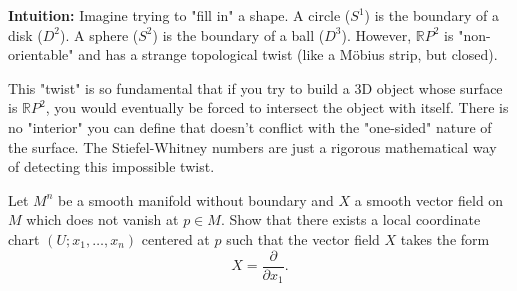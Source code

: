 \begin{solution}
\textbf{Intuition:}
Imagine trying to "fill in" a shape. A circle ($S^1$) is the boundary of a disk ($D^2$). A sphere ($S^2$) is the boundary of a ball ($D^3$). However, $\mathbb{R}P^2$ is "non-orientable" and has a strange topological twist (like a Möbius strip, but closed). 
\par\vspace{\baselineskip}

This "twist" is so fundamental that if you try to build a 3D object whose surface is $\mathbb{R}P^2$, you would eventually be forced to intersect the object with itself. There is no "interior" you can define that doesn't conflict with the "one-sided" nature of the surface. The Stiefel-Whitney numbers are just a rigorous mathematical way of detecting this impossible twist.
\end{solution}

\begin{exercise}
\label{geometry:2015:3}
Let $M^{n}$ be a smooth manifold without boundary and $X$ a smooth vector field on $M$ which does not vanish at $p \in M$. Show that there exists a local coordinate chart $(U; x_{1}, \ldots, x_{n})$ centered at $p$ such that the vector field $X$ takes the form
\[ X = \frac{\partial}{\partial x_{1}}. \]
\end{exercise}

